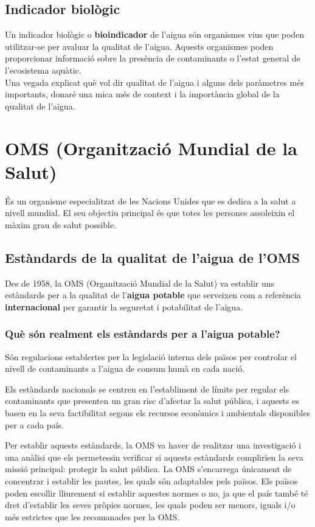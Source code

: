 \subsection{Indicador biològic} \label{subsec:indicadorbiologic}
Un indicador biològic o \textbf{bioindicador} de l’aigua són organismes vius que poden utilitzar-se per avaluar la qualitat de l’aigua. Aquests organismes poden proporcionar informació sobre la presència de contaminants o l’estat general de l’ecosistema aquàtic.\\

Una vegada explicat què vol dir qualitat de l’aigua i alguns dels paràmetres més importants, donaré una mica més de context i la importància global de la qualitat de l’aigua.

\section{OMS (Organització Mundial de la Salut)}
És un organisme especialitzat de les Nacions Unides que es dedica a la salut a nivell mundial. El seu objectiu principal és que totes les persones assoleixin el màxim grau de salut possible.
\subsection{Estàndards de la qualitat de l’aigua de l’OMS}
Des de 1958, la OMS (Organització Mundial de la Salut) va establir uns estàndards per a la qualitat de l’\textbf{aigua potable} que serveixen com a referència \textbf{internacional} per garantir la seguretat i potabilitat de l’aigua.
\subsubsection{Què són realment els estàndards per a l’aigua potable?}
Són regulacions establertes per la legislació interna dels països per controlar el nivell de contaminants a l’aigua de consum humà en cada nació.

Els estàndards nacionals se centren en l’establiment de límits per regular els contaminants que presenten un gran risc d’afectar la salut pública, i aquests es basen en la seva factibilitat segons els recursos econòmics i ambientals disponibles per a cada país.

Per establir aquests estàndards, la OMS va haver de realitzar una investigació i una anàlisi que els permetessin verificar si aquests estàndards complirien la seva missió principal: protegir la salut pública. La OMS s’encarrega únicament de concentrar i establir les pautes, les quals són adaptables pels països. Els països poden escollir lliurement si establir aquestes normes o no, ja que el país també té dret d’establir les seves pròpies normes, les quals poden ser menors, iguals i/o més estrictes que les recomanades per la OMS.
